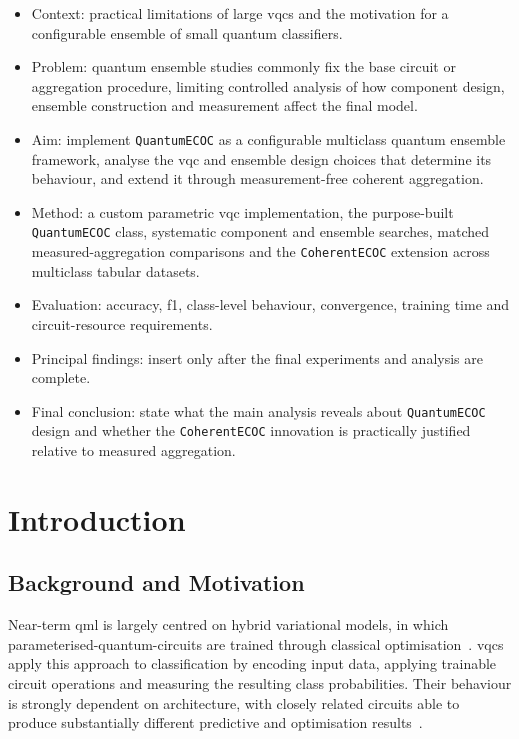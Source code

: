 \documentclass[]{UCD_CS_MSc_AAI_Report}
\begin{document}
\begin{itemize}
    \item Context: practical limitations of large \acp{vqc} and the motivation for a configurable ensemble of small quantum classifiers.
    \item Problem: quantum ensemble studies commonly fix the base circuit or aggregation procedure, limiting controlled analysis of how component design, ensemble construction and measurement affect the final model.
    \item Aim: implement \texttt{QuantumECOC} as a configurable multiclass quantum ensemble framework, analyse the \ac{vqc} and ensemble design choices that determine its behaviour, and extend it through measurement-free coherent aggregation.
    \item Method: a custom parametric \ac{vqc} implementation, the purpose-built \texttt{QuantumECOC} class, systematic component and ensemble searches, matched measured-aggregation comparisons and the \texttt{CoherentECOC} extension across multiclass tabular datasets.
    \item Evaluation: accuracy, \ac{f1}, class-level behaviour, convergence, training time and circuit-resource requirements.
    \item Principal findings: insert only after the final experiments and analysis are complete.
    \item Final conclusion: state what the main analysis reveals about \texttt{QuantumECOC} design and whether the \texttt{CoherentECOC} innovation is practically justified relative to measured aggregation.
\end{itemize}
\acresetall

\chapter{Introduction}
\label{chap:introduction}

\section{Background and Motivation}
\label{sec:intro-background}

Near-term \ac{qml} is largely centred on hybrid variational models, in which \glspl{parameterised-quantum-circuit} are trained through classical optimisation~\cite{du_quantum_2025}. \acp{vqc} apply this approach to classification by encoding input data, applying trainable circuit operations and measuring the resulting class probabilities. Their behaviour is strongly dependent on architecture, with closely related circuits able to produce substantially different predictive and optimisation results~\cite{pinto_composing_2026,cerezo_challenges_2022}.
\end{document}
